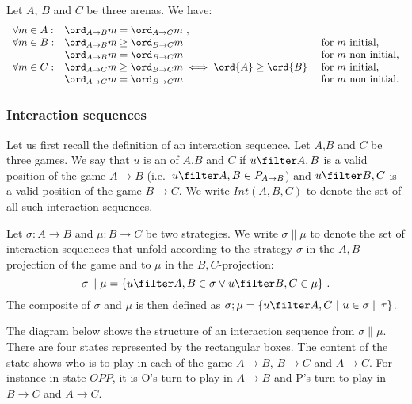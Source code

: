 \begin{lemma}
\label{lem:compositionorder}
Let $A$, $B$ and $C$ be three arenas. We have:
$$\begin{array}{lll}
\forall m \in A:
    &  \ord_{A\rightarrow B}{m} = \ord_{A\rightarrow C}{m} \ ,\\
\forall m \in B:
    & \ord_{A\rightarrow B}{m} \geq \ord_{B\rightarrow C}{m}  & \mbox{for $m$ initial,}\\
    & \ord_{A\rightarrow B}{m} = \ord_{B\rightarrow C}{m} & \mbox{for $m$ non initial,} \\
\forall m \in C:
    & \ord_{A\rightarrow C}{m} \geq \ord_{B\rightarrow C}{m} \iff
\ord{A} \geq \ord{B}\ & \mbox{for $m$ initial,}\\
    & \ord_{A\rightarrow C}{m} = \ord_{B\rightarrow C}{m}   & \mbox{for $m$ non initial.}
\end{array}
$$
\end{lemma}





\subsubsection{Interaction sequences}
Let us first recall the definition of an interaction sequence.
Let $A$,$B$ and $C$ be three games. 
We say that $u$  is an  of $A$,$B$ and $C$ if $u\filter A,B$ is a valid position of the game $A\rightarrow B$
(i.e.~$u\filter A,B \in P_{A\rightarrow B}$) 
and  $u\filter B,C$ is a valid position of the game
$B\rightarrow  C$. We write $Int(A,B,C)$ to denote
the set of all such interaction sequences.

Let $\sigma:A\rightarrow B$ and $\mu:B\rightarrow C$
be two strategies. We write $\sigma \parallel \mu$ to denote the 
set of interaction sequences that unfold according to the strategy $\sigma$ in the $A,B$-projection of the game and 
to $\mu$ in the $B,C$-projection:
$$ \sigma \parallel \mu = \{ u\filter A,B \in \sigma \vee u \filter B,C \in \mu \} \ .$$
The composite of $\sigma$ and $\mu$ is then defined as $\sigma ; \mu = \{ u \filter A,C \ | \ u \in \sigma \parallel \tau \}$.

The diagram below shows the structure of an interaction sequence
from $\sigma \parallel \mu$. There are four states represented by the rectangular boxes. The content of the state shows who is to play in each of the game $A\rightarrow B$, $B\rightarrow C$ and $A\rightarrow C$.
For instance in state $OPP$, it is O's turn to play in 
$A\rightarrow B$ and P's turn to play in $B\rightarrow C$ and $A\rightarrow C$.

